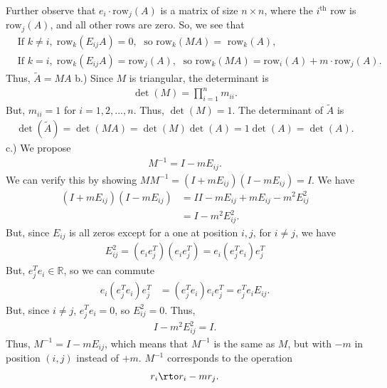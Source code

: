 \documentclass{report}
\begin{document}
    Further observe that $e_{i} \cdot \text{row}_{j}(A)$ is a matrix of size $n\times n$, where the $i^{\text{th}} $ row is $\text{row}_{j}(A)$, and all other rows are zero.
    \bigbreak \noindent 
    So, we see that 
    \begin{align*}
        &\text{If } k \ne i,\; \text{row}_{k}(E_{ij}A) = 0, \; \text{ so } \text{row}_{k}(MA) = \text{ row}_{k}(A), \\
        &\text{If } k = i,\; \text{row}_{k}(E_{ij}A) = \text{row}_{j}(A), \; \text{ so } \text{row}_{k}(MA) = \text{row}_{i}(A) + m \cdot  \text{row}_{j}(A)
    .\end{align*}
    Thus, $\tilde{A} = MA$
    \bigbreak \noindent 
    b.) Since $M$ is triangular, the determinant is
    \begin{align*}
        \det(M) = \prod_{i=1}^{n} m_{ii}
    .\end{align*}
    But, $m_{ii} = 1$ for $i=1,2,...,n$. Thus, $\det(M) = 1$. The determinant of $\tilde{A}$ is 
    \begin{align*}
        \det(\tilde{A}) = \det(MA)= \det(M)\det(A) = 1\det(A) = \det(A)
    .\end{align*}
    \bigbreak \noindent 
    c.) We propose
    \begin{align*}
        M^{-1} = I - mE_{ij}
    .\end{align*}
    We can verify this by showing $MM^{-1} = (I+mE_{ij})(I-mE_{ij}) = I $. We have
    \begin{align*}
        (I +mE_{ij})(I - mE_{ij}) &= II - mE_{ij} + mE_{ij} - m^{2}E_{ij}^{2} \\
                                  &= I - m^{2}E_{ij}^{2}
        .\end{align*}
    But, since $E_{ij}$ is all zeros except for a one at position $i,j$, for $i\ne j$, we have
    \begin{align*}
        E_{ij}^{2} = (e_{i}e_{j}^{T})(e_{i}e_{j}^{T}) = e_{i}(e_{j}^{T}e_{i})e_{j}^{T}
    \end{align*}
    But, $e_{j}^{T}e_{i} \in \mathbb{R}$, so we can commute
    \begin{align*}
        e_{i}(e_{j}^{T}e_{i})e_{j}^{T} &= (e_{j}^{T}e_{i})e_{i}e_{j}^{T} = e_{j}^{T}e_{i}E_{ij}
    .\end{align*}
    But, since $i\ne j$, $e_{j}^{T}e_{i} = 0$, so $E_{ij}^{2} = 0 $. Thus,
    \begin{align*}
        I - m^{2}E_{ij}^{2} = I
    .\end{align*}
    Thus, $M^{-1} = I - mE_{ij} $, which means that $M^{-1} $ is the same as $M$, but with $-m$ in position $(i,j)$ instead of $+m$. $M^{-1}$ corresponds to the operation
    \begin{align*}
        r_{i} \rto r_{i} - mr_{j}
    .\end{align*}
\end{document}
